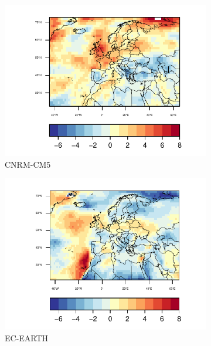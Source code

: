\begin{figure}[h]
  \centering\begin{subfigure}{0.4\textwidth}
    \includegraphics[width=1.2\textwidth]{figs/capitulo7/CNRM-CM5_ANOMALIAS_JJA_CLT_2050-2021.pdf}
    \caption{CNRM-CM5}
  \end{subfigure}
  \centering\begin{subfigure}{0.4\textwidth}
    \includegraphics[width=1.2\textwidth]{figs/capitulo7/EC-EARTH_ANOMALIAS_JJA_CLT_2050-2021.pdf}\hfill
    \caption{EC-EARTH}
  \end{subfigure}
  \hspace{0.1mm}
  \centering\begin{subfigure}{1\textwidth}  

\end{subfigure}
\end{figure}
